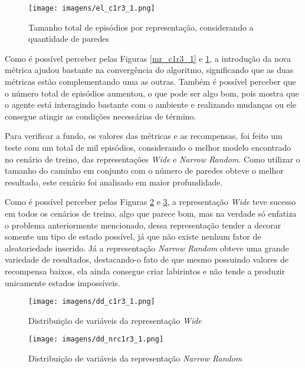 \begin{figure}[htb]
	\caption{\label{el_c1r3_1}Tamanho total de episódios por representação, considerando a quantidade de paredes}
	\begin{center}
	    \texttt{[image: imagens/el\_c1r3\_1.png]}
	\end{center}
\end{figure}

\FloatBarrier


Como é possível perceber pelas Figuras \ref{mr_c1r3_1} e \ref{el_c1r3_1}, 
a introdução da nova métrica ajudou bastante na convergência do algoritmo, 
significando que as duas métricas estão complementando uma as outras. 
Também é possível perceber que o número total de episódios aumentou, o que pode ser algo bom, pois mostra que o agente
está interagindo bastante com o ambiente e realizando mudanças ou ele consegue atingir as condições necessárias de término.

Para verificar a fundo, os valores das métricas e as recompensas, foi feito um teste com um total de mil episódios, 
considerando o melhor modelo encontrado no cenário de treino, das representações \textit{Wide} e \textit{Narrow Random}.
Como utilizar o tamanho do caminho em conjunto com o número de paredes obteve o melhor resultado, este cenário foi analisado
em maior profundidade.

Como é possível perceber pelas Figuras \ref{dd_c1r3_1} e \ref{dd_nrc1r3_1}, a representação \textit{Wide} teve sucesso em todos os cenários de treino, algo que parece bom, mas 
na verdade só enfatiza o problema anteriormente mencionado, dessa representação tender a decorar somente um tipo de estado 
possível, já que não existe nenhum fator de aleatoriedade inserido. Já a representação \textit{Narrow Random} obteve uma 
grande variedade de resultados, destacando-o fato de que mesmo possuindo valores de recompensa baixos, ela ainda consegue
criar labirintos e não tende a produzir unicamente estados impossíveis.

\begin{figure}[htb]
	\caption{\label{dd_c1r3_1}Distribuição de variáveis da representação \textit{Wide}}
	\begin{center}
	    \texttt{[image: imagens/dd\_c1r3\_1.png]}
	\end{center}
\end{figure}

\begin{figure}[htb]
	\caption{\label{dd_nrc1r3_1}Distribuição de variáveis da representação \textit{Narrow Random}}
	\begin{center}
	    \texttt{[image: imagens/dd\_nrc1r3\_1.png]}
	\end{center}
\end{figure}


